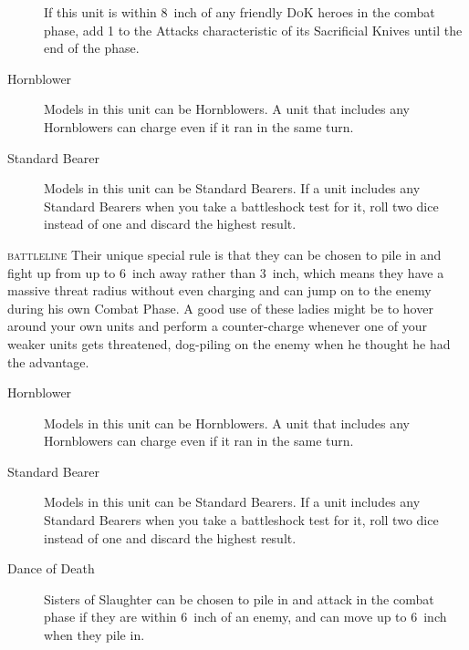 \begin{description}
    \item [] If this unit is within
        8~inch of any friendly \textsc{DoK} heroes in the combat phase, add 1 to the
        Attacks characteristic of its Sacrificial Knives until the end of the
        phase. 
    \item [Hornblower] Models in this unit can be Hornblowers. A unit that
        includes any Hornblowers can charge even if it ran in the same turn.
    \item [Standard Bearer] Models in this unit can be Standard Bearers. If
        a unit includes any Standard Bearers when you take a battleshock test
        for it, roll two dice instead of one and discard the highest result.
\end{description}

\textsc{battleline} Their unique special rule is
that they can be chosen to pile in and fight up from up to 6~inch away rather than
3~inch, which means they have a massive threat radius without even charging and can
jump on to the enemy during his own Combat Phase. A good use of these ladies
might be to hover around your own units and perform a counter-charge whenever
one of your weaker units gets threatened, dog-piling on the enemy when he
thought he had the advantage. 
\begin{description}
    \item [Hornblower] Models in this unit can be Hornblowers. A unit that
        includes any Hornblowers can charge even if it ran in the same turn.
    \item [Standard Bearer] Models in this unit can be Standard Bearers. If
        a unit includes any Standard Bearers when you take a battleshock test
        for it, roll two dice instead of one and discard the highest result.
    \item [Dance of Death] Sisters of Slaughter can be chosen to pile in and
        attack in the combat phase if they are within 6~inch of an enemy, and
        can move up to 6~inch when they pile in.
\end{description}

